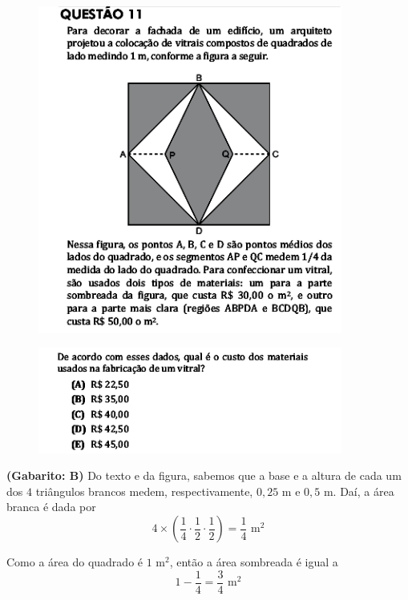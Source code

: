 \documentclass[a4paper]{article}
\begin{document}
\begin{figure}[H]
	\begin{center}
		\includegraphics[width=10cm]{L5Q11_1.png}
	\end{center}
\end{figure}
\begin{figure}[H]
	\begin{center}
		\includegraphics[width=10cm]{L5Q11_2.png}
	\end{center}
\end{figure}
\par\textbf{(Gabarito: B)} Do texto e da figura, sabemos que a base e a altura de cada um dos $4$ triângulos brancos medem, respectivamente, $0,25$ m e $0,5$ m. Daí, a área branca é dada por
\begin{equation*}
4\times \left( \frac{1}{4}\cdot\frac{1}{2}\cdot\frac{1}{2} \right) = \frac{1}{4}\text{ m}^2
\end{equation*}
\par\vspace{0.3cm} Como a área do quadrado é $1$ m$^2$, então a área sombreada é igual a
\begin{equation*}
1 - \frac{1}{4} = \frac{3}{4}\text{ m}^2
\end{equation*}
\end{document}
